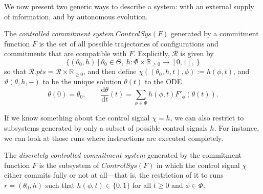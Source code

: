 \documentclass{article}
\newcommand\pts[1]{#1.\mathit{pts}}
\newcommand\R{\mathcal R}
\begin{document}
We now present two generic ways to describe a system: with an external supply of information, and by autonomous evolution.

\begin{defn}
    The \emph{controlled commitment system}
    $\mathit{ControlSys}(F)$
    generated by a commitment function $F$ is the set  of all possible trajectories of configurations and commitments that are compatible with $F$.
    Explicitly, $\R$ is given by
    \[
        \Big\{ (\theta_0, h) ~\Big|~  \theta_0 \in \Theta,~
            h : \Phi \times \mathbb R_{\ge 0} \to [0,1],~
             \Big\}
    \]
    so that $\pts \R = \R \times \mathbb R_{\ge 0}$,
    and then define
    $\chi((\theta_0,h,t),\phi) := h(\phi, t)$,
    and
    $\vartheta(\theta,h,-)$ to be the unique solution $\theta(t)$ to the ODE
    \[
        \theta(0) = \theta_0,
        \qquad \frac{\mathrm d\theta}{\mathrm d t} (t) =
            \sum_{\phi \in \Phi} h(\phi, t) F'_\phi(\theta(t)).
    \]
\end{defn}

If we know something about the control signal $\chi = h$, we can also restrict to subsystems generated by only a subset of possible
control signals $h$. For instance, we can look at those runs where instructions are executed completely.

\begin{defn}
    The \emph{discretely controlled commitment system} generated by the commitment function $F$ is the subsystem of $\mathit{ControlSys}(F)$ in which the control signal $\chi$ either commits fully or not at all---that is,
    the restriction of it to runs $r = (\theta_0, h)$ such that $h(\phi, t) \in \{0,1\}$
            for all $t \ge 0$ and $\phi \in \Phi$.
\end{defn}


%
\end{document}
